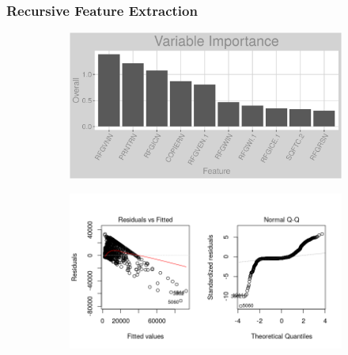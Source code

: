 \subsubsection{Recursive Feature Extraction}
\label{appendix:electricity:rfe}
\begin{figure}[h]
\centering
\begin{subfigure}{1\textwidth}
\centering
\includegraphics[width=.99\textwidth, height=0.3\textheight]{Images/electricity_rfe_vars.png}
\end{subfigure}
\begin{subfigure}{1\textwidth}
\centering
\includegraphics[width=.99\textwidth, height=0.475\textheight]{Images/electricity_rfe_res_1.png}
\end{subfigure}
\end{figure}
\newpage
